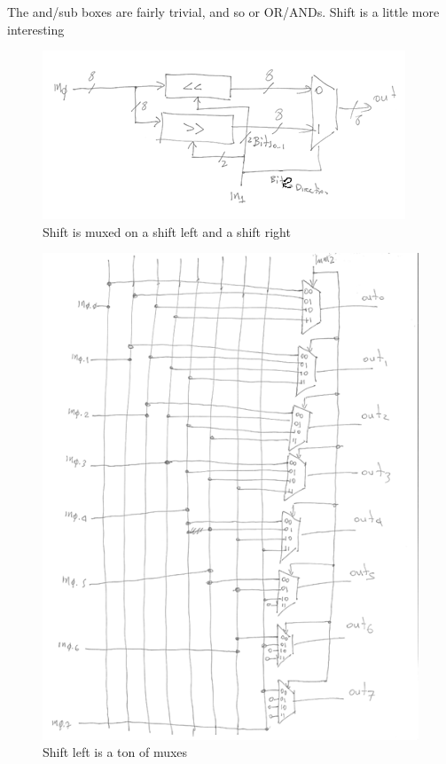 \documentclass[../notes.tex]{subfiles}
\begin{document}
\begin{definition}
	The and/sub boxes are fairly trivial, and so or OR/ANDs. Shift is a little more interesting
	\begin{figure}[H]
		\centering
		\includegraphics[width=0.8\linewidth]{img/image_2022-12-10-15-45-15.png}
		\caption{Shift is muxed on a shift left and a shift right}
	\end{figure}

	\begin{figure}[H]
		\centering
		\includegraphics[width=0.8\linewidth]{img/image_2022-12-10-15-45-32.png}
		\caption{Shift left is a ton of muxes}
	\end{figure}


\end{definition}
\end{document}
